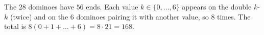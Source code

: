The $28$ dominoes have $56$ ends. Each value $k\in\{0,\dots,6\}$ appears on the double $k$-$k$ (twice) and on the $6$ dominoes pairing it with another value, so $8$ times. The total is $8(0+1+\dots+6)=8\cdot21=\boxed{168}$.
